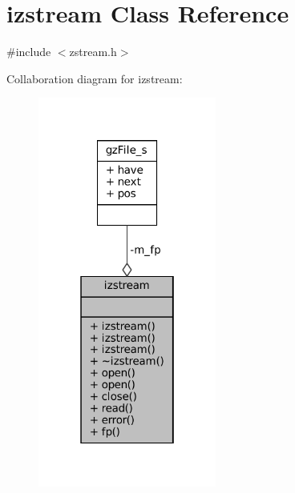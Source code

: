 \hypertarget{classizstream}{}\section{izstream Class Reference}
\label{classizstream}


{\ttfamily \#include $<$zstream.\+h$>$}



Collaboration diagram for izstream\+:
\nopagebreak
\begin{figure}[H]
\begin{center}
\leavevmode
\includegraphics[width=166pt]{classizstream__coll__graph}
\end{center}
\end{figure}
